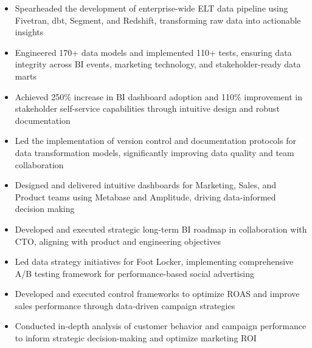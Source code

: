 \documentclass[10pt,a4paper,ragged2e,withhyper]{altacv}
\begin{document}
\begin{paracol}{2}
\divider
\smallskip
{}
\begin{itemize}
\item Spearheaded the development of enterprise-wide ELT data pipeline using Fivetran, dbt, Segment, and Redshift, transforming raw data into actionable insights
\item Engineered 170+ data models and implemented 110+ tests, ensuring data integrity across BI events, marketing technology, and stakeholder-ready data marts
\item Achieved 250\% increase in BI dashboard adoption and 110\% improvement in stakeholder self-service capabilities through intuitive design and robust documentation
\item Led the implementation of version control and documentation protocols for data transformation models, significantly improving data quality and team collaboration
\item Designed and delivered intuitive dashboards for Marketing, Sales, and Product teams using Metabase and Amplitude, driving data-informed decision making
\item Developed and executed strategic long-term BI roadmap in collaboration with CTO, aligning with product and engineering objectives
\end{itemize}


\begin{itemize}
\item Led data strategy initiatives for Foot Locker, implementing comprehensive A/B testing framework for performance-based social advertising
\item Developed and executed control frameworks to optimize ROAS and improve sales performance through data-driven campaign strategies
\item Conducted in-depth analysis of customer behavior and campaign performance to inform strategic decision-making and optimize marketing ROI
\end{itemize}

\divider


\end{paracol}
\end{document}
